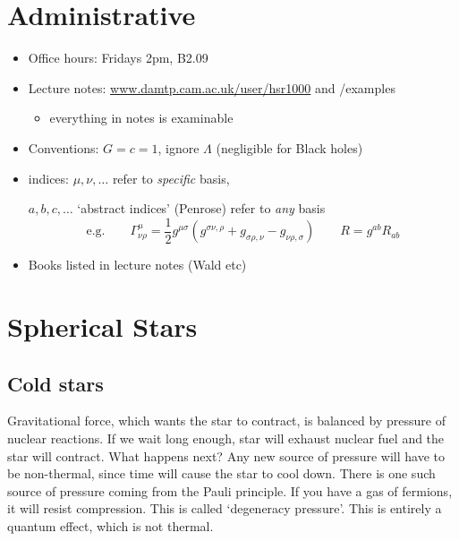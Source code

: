 
\chapter*{Administrative}%

\begin{itemize}
  \item Office hours: Fridays 2pm, B2.09
  \item Lecture notes: \url{www.damtp.cam.ac.uk/user/hsr1000} and /examples
    \begin{itemize}
      \item everything in notes is examinable
    \end{itemize}
  \item Conventions: $G = c = 1$, ignore $\Lambda$ (negligible for Black holes)
  \item indices: $\mu, \nu, \dots$ refer to \emph{specific} basis, \par
    $a, b, c, \dots$ `abstract indices' (Penrose) refer to \emph{any} basis
    \begin{equation}
      \text{e.g.} \qquad \Gamma^{\mu}_{\nu\rho} = \frac{1}{2} g^{\mu\sigma}(g^{\sigma\nu, \rho} + g_{\sigma\rho, \nu} - g_{\nu\rho, \sigma}) \qquad R = g^{ab} R_{ab}
    \end{equation}
  \item Books listed in lecture notes (Wald etc)
\end{itemize}

\chapter{Spherical Stars}%
\label{cha:spherical_stars}

\section{Cold stars}%
\label{sec:cold_stars}

Gravitational force, which wants the star to contract, is balanced by pressure of nuclear reactions. If we wait long enough, star will exhaust nuclear fuel and the star will contract. What happens next?
Any new source of pressure will have to be non-thermal, since time will cause the star to cool down.
There is one such source of pressure coming from the Pauli principle.
If you have a gas of fermions, it will resist compression. This is called `degeneracy pressure'.
This is entirely a quantum effect, which is not thermal.

